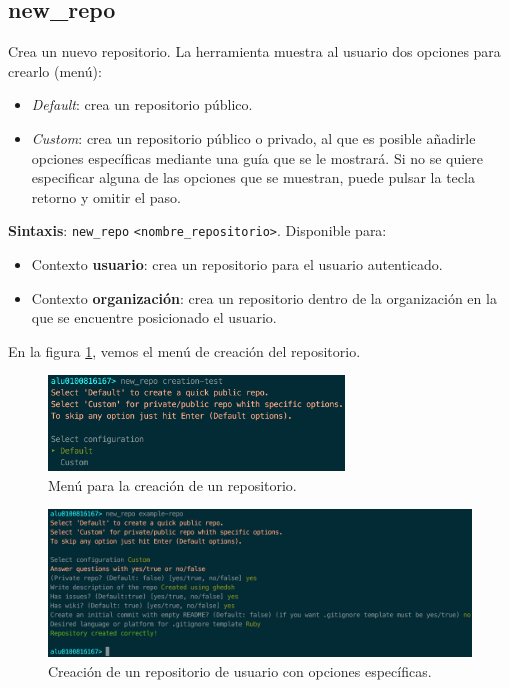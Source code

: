 \subsection{new\_repo}
\label{3.3.11}

Crea un nuevo repositorio. La herramienta muestra al usuario dos opciones para crearlo (menú):
\begin{itemize}
	\item {\it Default}: crea un repositorio público.
	\item {\it Custom}: crea un repositorio público o privado, al que es posible añadirle opciones específicas mediante una guía que se le mostrará.
	Si no se quiere especificar alguna de las opciones que se muestran, puede pulsar la tecla retorno y omitir el paso.
\end{itemize}
\textbf{Sintaxis}: \verb|new_repo| \verb|<nombre_repositorio>|.
Disponible para:
\begin{itemize}
	\item Contexto \textbf{usuario}: crea un repositorio para el usuario autenticado.
	\item Contexto \textbf{organización}: crea un repositorio dentro de la organización en la que se encuentre posicionado el usuario.
\end{itemize}
En la figura \ref{fig:create-repo}, vemos el menú de creación del repositorio.
\begin{figure}[H]
	\begin{center}
	\includegraphics[width=0.70\textwidth]{images/create-repo.png}
	\caption{Menú para la creación de un repositorio.}
	\label{fig:create-repo}
	\end{center}
\end{figure}

\begin{figure}[H]
	\begin{center}
	\includegraphics[width=1\textwidth]{images/custom-repo.png}
	\caption{Creación de un repositorio de usuario con opciones específicas.}
	\label{fig:custom-repo}
	\end{center}
\end{figure}

